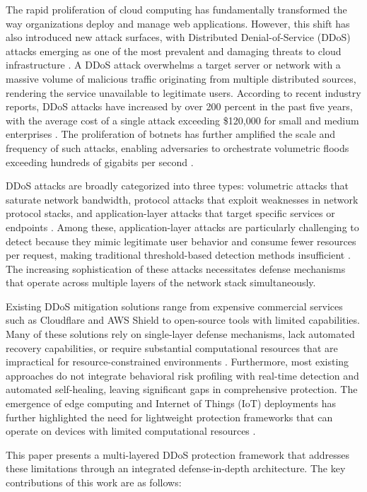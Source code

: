 \documentclass[conference]{IEEEtran}
\begin{document}
The rapid proliferation of cloud computing has fundamentally transformed the way organizations deploy and manage web applications. However, this shift has also introduced new attack surfaces, with Distributed Denial-of-Service (DDoS) attacks emerging as one of the most prevalent and damaging threats to cloud infrastructure \cite{b1}. A DDoS attack overwhelms a target server or network with a massive volume of malicious traffic originating from multiple distributed sources, rendering the service unavailable to legitimate users. According to recent industry reports, DDoS attacks have increased by over 200 percent in the past five years, with the average cost of a single attack exceeding \$120,000 for small and medium enterprises \cite{b2}. The proliferation of botnets has further amplified the scale and frequency of such attacks, enabling adversaries to orchestrate volumetric floods exceeding hundreds of gigabits per second \cite{b10}.

DDoS attacks are broadly categorized into three types: volumetric attacks that saturate network bandwidth, protocol attacks that exploit weaknesses in network protocol stacks, and application-layer attacks that target specific services or endpoints \cite{b1} \cite{b18}. Among these, application-layer attacks are particularly challenging to detect because they mimic legitimate user behavior and consume fewer resources per request, making traditional threshold-based detection methods insufficient \cite{b12} \cite{b19}. The increasing sophistication of these attacks necessitates defense mechanisms that operate across multiple layers of the network stack simultaneously.

Existing DDoS mitigation solutions range from expensive commercial services such as Cloudflare and AWS Shield to open-source tools with limited capabilities. Many of these solutions rely on single-layer defense mechanisms, lack automated recovery capabilities, or require substantial computational resources that are impractical for resource-constrained environments \cite{b3}. Furthermore, most existing approaches do not integrate behavioral risk profiling with real-time detection and automated self-healing, leaving significant gaps in comprehensive protection. The emergence of edge computing and Internet of Things (IoT) deployments has further highlighted the need for lightweight protection frameworks that can operate on devices with limited computational resources \cite{b11}.

This paper presents a multi-layered DDoS protection framework that addresses these limitations through an integrated defense-in-depth architecture. The key contributions of this work are as follows:
\end{document}
